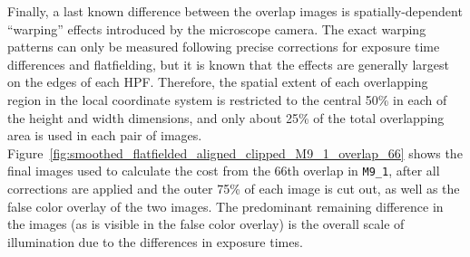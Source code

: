\documentclass[letterpaper,11pt]{article}
\newcommand{\reffig}[1]{Figure~\ref{#1}}
\begin{document}
Finally, a last known difference between the overlap images is spatially-dependent ``warping'' effects introduced by the microscope camera. The exact warping patterns can only be measured following precise corrections for exposure time differences and flatfielding, but it is known that the effects are generally largest on the edges of each HPF. Therefore, the spatial extent of each overlapping region in the local coordinate system is restricted to the central 50\% in each of the height and width dimensions, and only about 25\% of the total overlapping area is used in each pair of images. \reffig{fig:smoothed_flatfielded_aligned_clipped_M9_1_overlap_66} shows the final images used to calculate the cost from the 66th overlap in \texttt{M9\_1}, after all corrections are applied and the outer 75\% of each image is cut out, as well as the false color overlay of the two images. The predominant remaining difference in the images (as is visible in the false color overlay) is the overall scale of illumination due to the differences in exposure times. 
\end{document}
